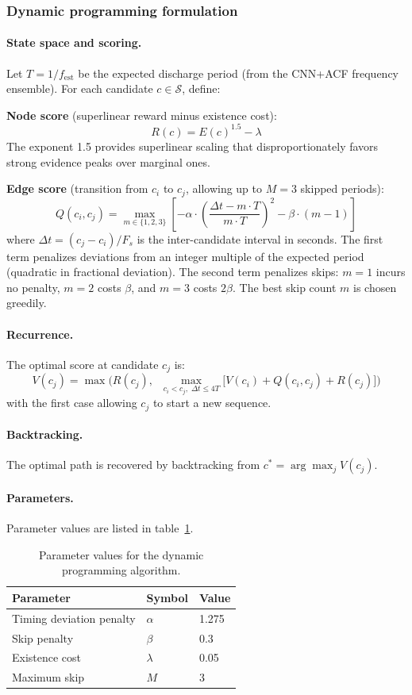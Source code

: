 \subsubsection{Dynamic programming formulation}

\paragraph{State space and scoring.}
Let $T = 1 / f_{\mathrm{est}}$ be the expected discharge period (from the CNN+ACF frequency ensemble). For each candidate $c \in \mathcal{S}$, define:

\textbf{Node score} (superlinear reward minus existence cost):
\[ R(c) = E(c)^{1.5} - \lambda \tag{7} \]
The exponent 1.5 provides superlinear scaling that disproportionately favors strong evidence peaks over marginal ones.

\textbf{Edge score} (transition from $c_i$ to $c_j$, allowing up to $M = 3$ skipped periods):
\[ Q(c_i, c_j) = \max_{m \in \{1, 2, 3\}} \left[-\alpha \cdot \left(\frac{\Delta t - m \cdot T}{m \cdot T}\right)^{\!2} - \beta \cdot (m - 1)\right] \tag{8} \]
where $\Delta t = (c_j - c_i) / F_s$ is the inter-candidate interval in seconds. The first term penalizes deviations from an integer multiple of the expected period (quadratic in fractional deviation). The second term penalizes skips: $m = 1$ incurs no penalty, $m = 2$ costs $\beta$, and $m = 3$ costs $2\beta$. The best skip count $m$ is chosen greedily.

\paragraph{Recurrence.}
The optimal score at candidate $c_j$ is:
\[ V(c_j) = \max\!\bigg(R(c_j),\;\; \max_{c_i < c_j,\; \Delta t \leq 4T} \big[V(c_i) + Q(c_i, c_j) + R(c_j)\big]\bigg) \tag{9} \]
with the first case allowing $c_j$ to start a new sequence.

\paragraph{Backtracking.}
The optimal path is recovered by backtracking from $c^* = \arg\max_j V(c_j)$.

\paragraph{Parameters.}
Parameter values are listed in table~\ref{tab:dp_params}.

\begin{table}[h]
\centering
\caption{Parameter values for the dynamic programming algorithm.}
\label{tab:dp_params}
\begin{tabular}{lll}
\hline
Parameter & Symbol & Value \\
\hline
Timing deviation penalty & $\alpha$ & 1.275 \\
Skip penalty & $\beta$ & 0.3 \\
Existence cost & $\lambda$ & 0.05 \\
Maximum skip & $M$ & 3 \\
\hline
\end{tabular}
\end{table}

